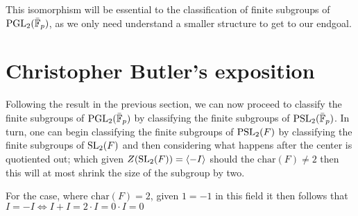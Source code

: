 This isomorphism will be essential to the classification of finite subgroups of $\operatorname{PGL}_2(\bar{\mathbb{F}}_p)$, as we only need understand a smaller structure to get to our endgoal.


\section{Christopher Butler's exposition}

Following the result in the previous section, we can now proceed to classify the finite subgroups of $\operatorname{PGL}_2(\bar{\mathbb{F}}_p)$ by classifying the finite subgroups of $\operatorname{PSL}_2(\bar{\mathbb{F}}_p)$. In turn, one can begin classifying the finite subgroups of $\operatorname{PSL}_2(F)$ by classifying the finite subgroups of $\operatorname{SL}_2(F)$ and then considering what happens after the center is quotiented out; which given $Z(\operatorname{SL}_2(F)) = \langle -I\rangle$ should the $\textrm{char}(F) \ne 2$ then this will at most shrink the size of the subgroup by two. 

For the case, where $\textrm{char}(F) = 2$, given $1 = -1$ in this field it then follows that $I = -I \iff I + I =  2 \cdot I = 0 \cdot I = 0$